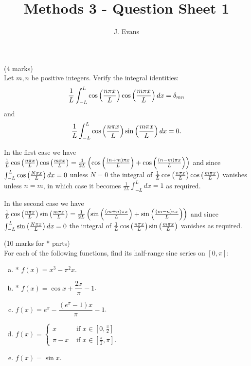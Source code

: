 \documentclass[12pt]{article}
\title{Methods 3 - Question Sheet 1}
\author{J. Evans}
\date{}
\begin{document}
\maketitle

\begin{question}(4 marks)\\
Let $m,n$ be positive integers. Verify the integral identities:
\[
\frac{1}{L}\int_{-L}^L\cos\left(\frac{n \pi x}{L}\right)\cos\left(\frac{m \pi x}{L}\right)dx=\delta_{mn}
\]
and
\[
\frac{1}{L}\int_{-L}^L\cos\left(\frac{n \pi x}{L}\right)\sin\left(\frac{m \pi x}{L}\right)dx= 0.
\]
\end{question}

\begin{answer}
In the first case we have $\frac{1}{L}\cos\left(\frac{n \pi x}{L}\right)\cos\left(\frac{m \pi x}{L}\right)=\frac{1}{2L}\left(\cos\left(\frac{(n+m) \pi x}{L}\right)+\cos\left(\frac{(n-m) \pi x}{L}\right)\right)$ and since $\int_{-L}^L\cos\left(\frac{N \pi x}{L}\right)dx=0$ unless $N=0$ the integral of $\frac{1}{L}\cos\left(\frac{n \pi x}{L}\right)\cos\left(\frac{m \pi x}{L}\right)$ vanishes unless $n=m$, in which case it becomes $\frac{1}{2L}\int_{-L}^Ldx=1$ as required.

In the second case we have $\frac{1}{L}\cos\left(\frac{n \pi x}{L}\right)\sin\left(\frac{m \pi x}{L}\right)=\frac{1}{2L}\left(\sin\left(\frac{(m+n) \pi x}{L}\right)+\sin\left(\frac{(m-n) \pi x}{L}\right)\right)$ and since $\int_{-L}^L\sin\left(\frac{N \pi x}{L}\right)dx=0$ the integral of $\frac{1}{L}\cos\left(\frac{n \pi x}{L}\right)\sin\left(\frac{m \pi x}{L}\right)$ vanishes as required.
\end{answer}

\newpage

\vspace{0.5cm}

\begin{question}(10 marks for * parts)\\
For each of the following functions, find its half-range sine series on $[0,\pi]$:
\begin{enumerate}[(a)]
\item * $f(x)=x^3-\pi^2x$.
\item * $f(x)=\cos x+\dfrac{2x}{\pi}-1$.
\item $f(x)=e^x-\dfrac{(e^{\pi}-1)x}{\pi}-1$.
\item $f(x)=\begin{cases}x&\mbox{ if }x\in\left[0,\tfrac{\pi}{2}\right]\\ \pi-x&\mbox{ if }x\in\left[\tfrac{\pi}{2},\pi\right].\end{cases}$
\item $f(x)=\sin x$.
\end{enumerate}
\end{question}
\end{document}
